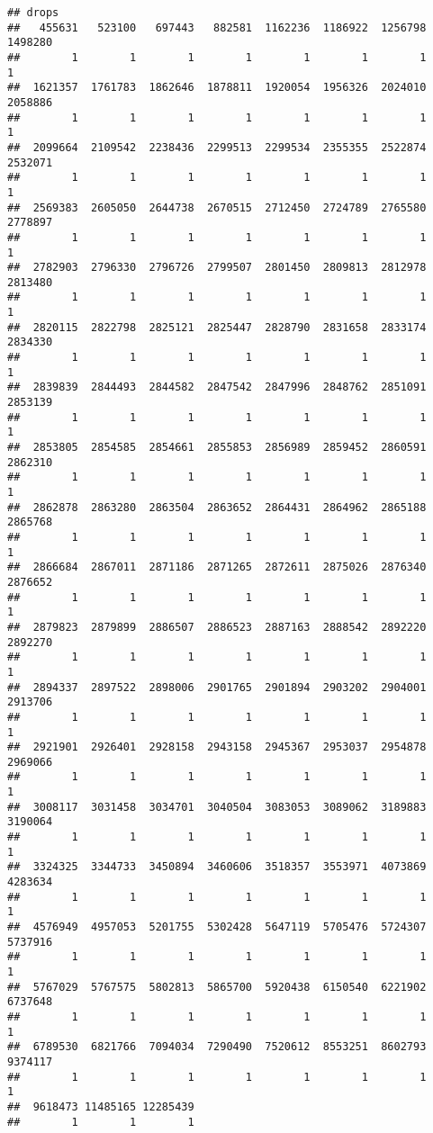 \documentclass[
]{article}
\begin{document}
\begin{verbatim}
## drops
##   455631   523100   697443   882581  1162236  1186922  1256798  1498280 
##        1        1        1        1        1        1        1        1 
##  1621357  1761783  1862646  1878811  1920054  1956326  2024010  2058886 
##        1        1        1        1        1        1        1        1 
##  2099664  2109542  2238436  2299513  2299534  2355355  2522874  2532071 
##        1        1        1        1        1        1        1        1 
##  2569383  2605050  2644738  2670515  2712450  2724789  2765580  2778897 
##        1        1        1        1        1        1        1        1 
##  2782903  2796330  2796726  2799507  2801450  2809813  2812978  2813480 
##        1        1        1        1        1        1        1        1 
##  2820115  2822798  2825121  2825447  2828790  2831658  2833174  2834330 
##        1        1        1        1        1        1        1        1 
##  2839839  2844493  2844582  2847542  2847996  2848762  2851091  2853139 
##        1        1        1        1        1        1        1        1 
##  2853805  2854585  2854661  2855853  2856989  2859452  2860591  2862310 
##        1        1        1        1        1        1        1        1 
##  2862878  2863280  2863504  2863652  2864431  2864962  2865188  2865768 
##        1        1        1        1        1        1        1        1 
##  2866684  2867011  2871186  2871265  2872611  2875026  2876340  2876652 
##        1        1        1        1        1        1        1        1 
##  2879823  2879899  2886507  2886523  2887163  2888542  2892220  2892270 
##        1        1        1        1        1        1        1        1 
##  2894337  2897522  2898006  2901765  2901894  2903202  2904001  2913706 
##        1        1        1        1        1        1        1        1 
##  2921901  2926401  2928158  2943158  2945367  2953037  2954878  2969066 
##        1        1        1        1        1        1        1        1 
##  3008117  3031458  3034701  3040504  3083053  3089062  3189883  3190064 
##        1        1        1        1        1        1        1        1 
##  3324325  3344733  3450894  3460606  3518357  3553971  4073869  4283634 
##        1        1        1        1        1        1        1        1 
##  4576949  4957053  5201755  5302428  5647119  5705476  5724307  5737916 
##        1        1        1        1        1        1        1        1 
##  5767029  5767575  5802813  5865700  5920438  6150540  6221902  6737648 
##        1        1        1        1        1        1        1        1 
##  6789530  6821766  7094034  7290490  7520612  8553251  8602793  9374117 
##        1        1        1        1        1        1        1        1 
##  9618473 11485165 12285439 
##        1        1        1
\end{verbatim}
\end{document}
